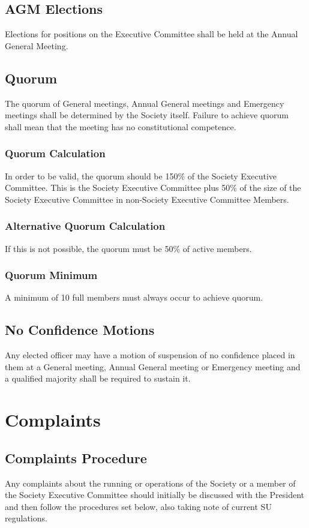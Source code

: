 \documentclass[11pt,a4paper]{article}
\begin{document}
\subsection{AGM Elections}
Elections for positions on the Executive Committee shall be held at the Annual General Meeting.

\subsection{Quorum}
The quorum of General meetings, Annual General meetings and Emergency meetings shall be determined by the Society itself. Failure to achieve quorum shall mean that the meeting has no constitutional competence.

\subsubsection{Quorum Calculation}
In order to be valid, the quorum should be 150\% of the Society Executive Committee. This is the Society Executive Committee plus 50\% of the size of the Society Executive Committee in non-Society Executive Committee Members.

\subsubsection{Alternative Quorum Calculation}
If this is not possible, the quorum must be 50\% of active members.

\subsubsection{Quorum Minimum}
A minimum of 10 full members must always occur to achieve quorum.

\subsection{No Confidence Motions}
Any elected officer may have a motion of suspension of no confidence placed in them at a General meeting, Annual General meeting or Emergency meeting and a qualified majority shall be required to sustain it.

\section{Complaints}\label{sec:complaints}
\subsection{Complaints Procedure}
Any complaints about the running or operations of the Society or a member of the Society Executive Committee should initially be discussed with the President and then follow the procedures set below, also taking note of current SU regulations.
\end{document}
